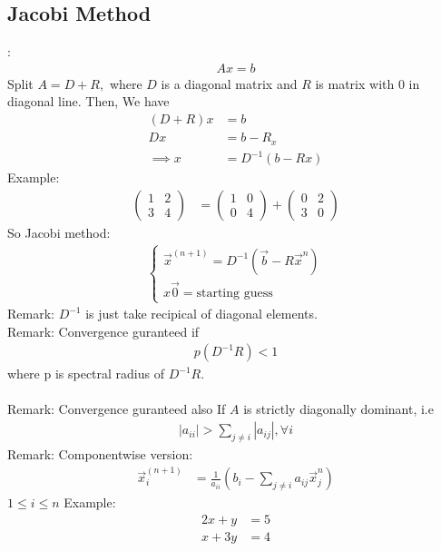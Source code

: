 \documentclass[11pt,oneside]{book}
\theoremstyle{break}
\theoremstyle{break}
\newcommand{\remark}{\color{blue}Remark: \color{black}}
\newcommand{\example}{\color{purple}Example: \color{black}}
\begin{document}
\subsection[Jacobi Method]{Jacobi Method}:\begin{align*}
Ax=b
\end{align*}
Split $A=D+R,$ where $D$ is a diagonal matrix and $R$ is matrix with 0 in diagonal line. Then, We have \begin{align*}
(D+R)x&=b\\
Dx&=b-R_x\\
\implies x&=D^{-1}(b-Rx)
\end{align*}
\example \begin{align*}
\begin{pmatrix}
1&2\\
3&4
\end{pmatrix}&=\begin{pmatrix}
1&0\\
0&4
\end{pmatrix}+\begin{pmatrix}
0&2\\
3&0
\end{pmatrix}
\end{align*}
So Jacobi method: \begin{align*}
\begin{cases}
\vec{x}^{(n+1)}=D^{-1}(\vec{b}-R\vec{x}^n)\\
x\vec{0}=\text{starting guess}
\end{cases}
\end{align*}
\remark $D^{-1}$ is just take recipical of diagonal elements.\\
\remark Convergence guranteed if \begin{align*}
p(D^{-1}R)<1
\end{align*}
where p is spectral radius of $D^{-1}R$.\\
\hfill\\
\remark Convergence guranteed also If $A$ is strictly diagonally dominant, i.e \begin{align*}
|a_{ii}|>\sum_{j\neq i}|a_{ij}|,\forall i
\end{align*}
\remark Componentwise version: \begin{align*}
\vec{x}_i^{(n+1)}&=\frac{1}{a_{ii}}\left(b_i-\sum_{j\neq i}a_{ij}\vec{x}_j^n \right)
\end{align*}
$1\leq i\leq n$
\example \begin{align*}
2x+y&=5\\
x+3y&=4
\end{align*}
\end{document}
